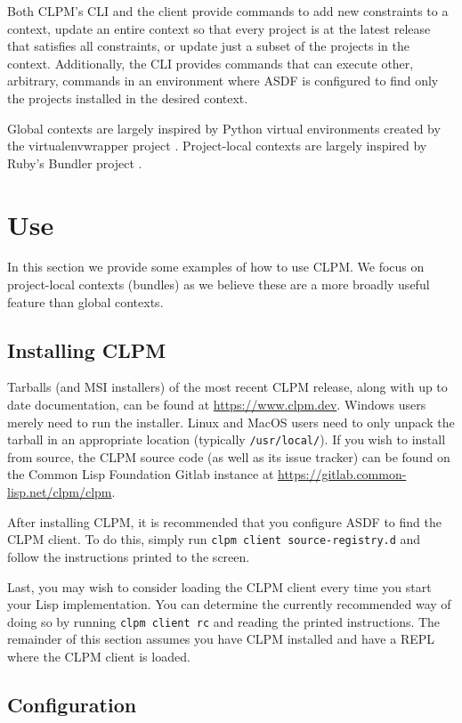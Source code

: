 \documentclass[format=sigconf]{acmart}
\begin{document}
Both CLPM's CLI and the client provide commands to add new constraints to a
context, update an entire context so that every project is at the latest
release that satisfies all constraints, or update just a subset of the projects
in the context. Additionally, the CLI provides commands that can execute other,
arbitrary, commands in an environment where ASDF is configured to find only the
projects installed in the desired context.

Global contexts are largely inspired by Python virtual environments created by
the virtualenvwrapper project \cite{virtualenvwrapper}. Project-local contexts
are largely inspired by Ruby's Bundler project \cite{bundler}.

\section{Use}

In this section we provide some examples of how to use CLPM. We focus on
project-local contexts (bundles) as we believe these are a more broadly useful
feature than global contexts.

\subsection{Installing CLPM}

Tarballs (and MSI installers) of the most recent CLPM release, along with up to
date documentation, can be found at \url{https://www.clpm.dev}. Windows users
merely need to run the installer. Linux and MacOS users need to only unpack the
tarball in an appropriate location (typically {\tt /usr/local/}). If you wish
to install from source, the CLPM source code (as well as its issue tracker) can
be found on the Common Lisp Foundation Gitlab instance at
\url{https://gitlab.common-lisp.net/clpm/clpm}.

After installing CLPM, it is recommended that you configure ASDF to find the
CLPM client. To do this, simply run {\tt clpm client source-registry.d} and
follow the instructions printed to the screen.

Last, you may wish to consider loading the CLPM client every time you start
your Lisp implementation. You can determine the currently recommended way of
doing so by running {\tt clpm client rc} and reading the printed
instructions. The remainder of this section assumes you have CLPM installed and
have a REPL where the CLPM client is loaded.

\subsection{Configuration}
\end{document}
